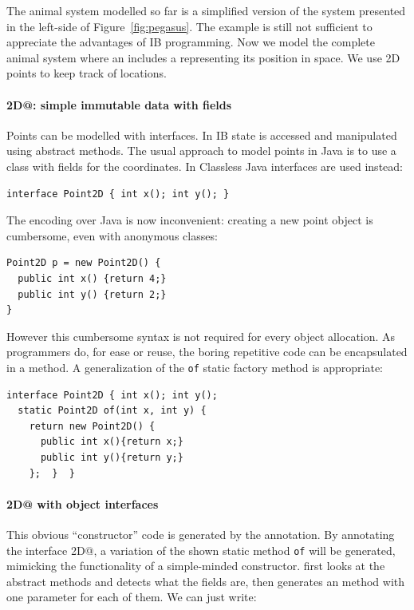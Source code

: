 The animal system modelled so far is a simplified version of the
system presented in the left-side of Figure~\ref{fig:pegasus}.
The example is still not sufficient to appreciate the advantages of IB
programming.
Now we model the complete animal system where an \Q@Animal@ includes a \Q@location@
representing its position in space. We use 2D points to keep track of locations.

\paragraph{\Q@Point2D@: simple immutable data with fields}
Points can be modelled with interfaces.
 In IB
 state is accessed and
manipulated using abstract methods.  The usual approach to model
points in Java is to use a class with fields for the coordinates.
In Classless Java interfaces are used instead:

\begin{lstlisting}
interface Point2D { int x(); int y(); }
\end{lstlisting}

\noindent The encoding over Java is now inconvenient: creating a new point object is cumbersome, even
with anonymous classes:

\begin{lstlisting}
Point2D p = new Point2D() {
  public int x() {return 4;}
  public int y() {return 2;}
}
\end{lstlisting}

\noindent However this cumbersome syntax is not required for every
object allocation. As programmers do, for ease or reuse, the boring
repetitive code can be encapsulated in a method. A generalization of the
\texttt{of} static factory method is appropriate:%
\begin{lstlisting}
interface Point2D { int x(); int y();
  static Point2D of(int x, int y) {
    return new Point2D() {
      public int x(){return x;}
      public int y(){return y;}
    };  }  }
\end{lstlisting}

\vspace{-5pt}
\paragraph{\Q@Point2D@ with object interfaces}
This obvious ``constructor'' code is generated by the \mixin
annotation.  By annotating the interface \Q@Point2D@, a variation of the shown
static method \texttt{of} will be generated, mimicking the functionality of a
simple-minded constructor. \mixin first looks at the abstract methods and detects
what the fields are, then generates an \Q@of@ method with one parameter for each
of them. We can just write:

